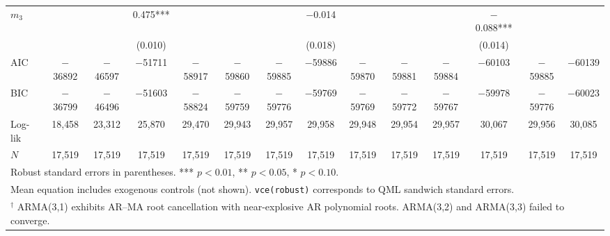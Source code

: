 \begin{table}[!htbp]
{\begin{tabular}{lccccccccccccc}
$m_{3}$ &  &  & 0.475*** &  &  &  & $-$0.014 &  &  &  & $-$0.088*** &  &  \\
        &  &  & (0.010)  &  &  &  & (0.018)  &  &  &  & (0.014)     &  &  \\
\midrule
AIC     & $-$36892 & $-$46597 & $-$51711 & $-$58917 & $-$59860 & $-$59885 & $-$59886 & $-$59870 & $-$59881 & $-$59884 & $-$60103 & $-$59885 & $-$60139 \\
BIC     & $-$36799 & $-$46496 & $-$51603 & $-$58824 & $-$59759 & $-$59776 & $-$59769 & $-$59769 & $-$59772 & $-$59767 & $-$59978 & $-$59776 & $-$60023 \\
Log-lik & 18{,}458 & 23{,}312 & 25{,}870 & 29{,}470 & 29{,}943 & 29{,}957 & 29{,}958 & 29{,}948 & 29{,}954 & 29{,}957 & 30{,}067 & 29{,}956 & 30{,}085 \\
$N$     & 17{,}519 & 17{,}519 & 17{,}519 & 17{,}519 & 17{,}519 & 17{,}519 & 17{,}519 & 17{,}519 & 17{,}519 & 17{,}519 & 17{,}519 & 17{,}519 & 17{,}519 \\
\bottomrule
\multicolumn{14}{l}{\footnotesize Robust standard errors in parentheses. *** $p<0.01$, ** $p<0.05$, * $p<0.10$.} \\
\multicolumn{14}{l}{\footnotesize Mean equation includes exogenous controls (not shown). \texttt{vce(robust)} corresponds to QML sandwich standard errors.} \\
\multicolumn{14}{l}{\footnotesize $^\dagger$ ARMA(3,1) exhibits AR--MA root cancellation with near-explosive AR polynomial roots. ARMA(3,2) and ARMA(3,3) failed to converge.} \\
\end{tabular}%
}
\end{table}
